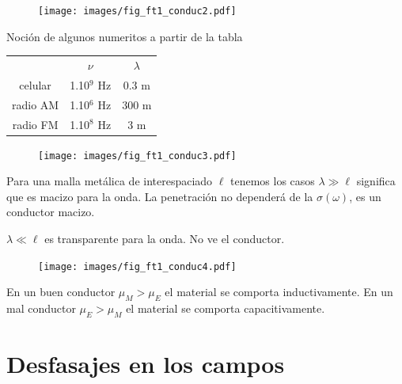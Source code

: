 \documentclass[10pt,oneside]{CBFT_book}
\begin{document}
\begin{figure}[htb]
	\begin{center}
	\texttt{[image: images/fig\_ft1\_conduc2.pdf]}	 
	\end{center}
	\caption{}
\end{figure} 

Noción de algunos numeritos a partir de la tabla

\begin{center}
\begin{tabular}{ c c c }
& $\nu$ & $\lambda$ \\
celular & 1.10$^9$ Hz & 0.3 m \\
radio AM  & 1.10$^6$ Hz  & 300 m \\
radio FM & 1.10$^8$ Hz & 3 m
\end{tabular}
\end{center}



\begin{figure}[htb]
	\begin{center}
	\texttt{[image: images/fig\_ft1\_conduc3.pdf]}	 
	\end{center}
	\caption{}
\end{figure} 

Para una malla metálica de interespaciado $\ell$ tenemos los casos
$\lambda \gg \ell$ significa que es macizo para la onda. La penetración no dependerá
de la $\sigma(\omega)$, es un conductor macizo.

$\lambda \ll \ell$ es transparente para la onda. No ve el conductor.

\begin{figure}[htb]
	\begin{center}
	\texttt{[image: images/fig\_ft1\_conduc4.pdf]} 
	\end{center}
	\caption{}
\end{figure} 

En un buen conductor $ \mu_M > \mu_E $ el material se comporta inductivamente.
En un mal conductor $ \mu_E > \mu_M $ el material se comporta capacitivamente.

\section{Desfasajes en los campos}
\end{document}
